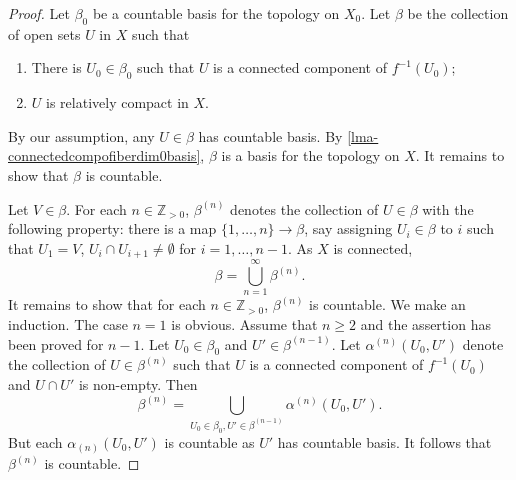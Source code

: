 \begin{proof}
    Let $\beta_0$ be a countable basis for the topology on $X_0$. Let $\beta$ be the collection of open sets $U$ in $X$ such that
    \begin{enumerate}
        \item There is $U_0\in \beta_0$ such that $U$ is a connected component of $f^{-1}(U_0)$;
        \item $U$ is relatively compact in $X$.
    \end{enumerate}
    By our assumption, any $U\in \beta$ has countable basis. By \cref{lma-connectedcompofiberdim0basis}, $\beta$ is a basis for the topology on $X$. It remains to show that $\beta$ is countable.

    Let $V\in \beta$. For each $n\in \mathbb{Z}_{>0}$, $\beta^{(n)}$ denotes the collection of $U\in \beta$ with the following property: there is a map $\{1,\ldots,n\}\rightarrow \beta$, say assigning $U_i\in \beta$ to $i$ such that $U_1=V$, $U_i\cap U_{i+1}\neq \emptyset$ for $i=1,\ldots,n-1$. As $X$ is connected,
    \[
        \beta=\bigcup_{n=1}^{\infty}\beta^{(n)}.  
    \]
    It remains to show that for each $n\in \mathbb{Z}_{>0}$, $\beta^{(n)}$ is countable. We make an induction. The case $n=1$ is obvious. Assume that $n\geq 2$ and the assertion has been proved for $n-1$. Let $U_0\in \beta_0$ and $U'\in \beta^{(n-1)}$. Let $\alpha^{(n)}(U_0,U')$ denote the collection of $U\in \beta^{(n)}$ such that $U$ is a connected component of $f^{-1}(U_0)$ and $U\cap U'$ is non-empty. Then
    \[
        \beta^{(n)}=\bigcup_{U_0\in \beta_0,U'\in \beta^{(n-1)}}\alpha^{(n)}(U_0,U').  
    \]
    But each $\alpha_{(n)}(U_0,U')$ is countable as $U'$ has countable basis. It follows that $\beta^{(n)}$ is countable.
\end{proof}

